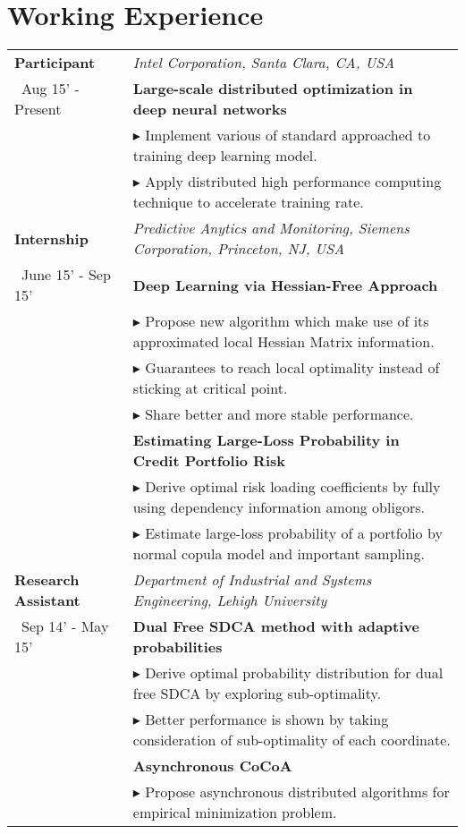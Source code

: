 \documentclass[a4paper,11pt]{article} %
\newcommand{\lst}[1]{\quad\footnotesize{$\blacktriangleright$ #1.}}
\begin{document}
\section{Working Experience}
\begin{longtable}{>{\centering}p{3.35cm}|p{14cm}}
    \small{\textbf{Participant}}& \textit{Intel Corporation, Santa Clara, CA, USA}\\\
    \small{Aug 15' - Present}&\textbf{Large-scale distributed optimization in deep neural networks}\\ 
    & \lst{Implement various of standard approached to training deep learning model}\\
    &\lst {Apply distributed high performance computing technique to accelerate training rate}\\

    \small{\textbf{Internship}}& \textit{Predictive Anytics and Monitoring, Siemens Corporation, Princeton, NJ, USA}\\\
    \small{June 15' - Sep 15'}&\textbf{Deep Learning via Hessian-Free Approach}\\
    & \lst{Propose new algorithm which make use of its approximated local Hessian Matrix information}\\
    &\lst{Guarantees to reach local optimality instead of sticking at critical point}\\
    &\lst{Share better and more stable performance}\\
    & \textbf{Estimating Large-Loss Probability in Credit Portfolio Risk}   \\
    &  \lst{Derive optimal risk loading coefficients by fully using dependency information among obligors}\\
    &  \lst{Estimate large-loss probability of a portfolio by normal copula model and important sampling}\\

    \small{\textbf{Research Assistant}}& \textit{Department of Industrial and Systems Engineering, Lehigh University}\\\
    \small{Sep 14' - May 15'}&\textbf{Dual Free SDCA method with adaptive probabilities}\\ 
    & \lst{Derive optimal probability distribution for dual free SDCA by exploring sub-optimality}\\
    &\lst {Better performance is shown by taking consideration of sub-optimality of each coordinate}\\
    &\textbf{Asynchronous CoCoA}\\ 
    & \lst{Propose asynchronous distributed algorithms for empirical minimization problem}\\


\end{longtable}
\end{document}
